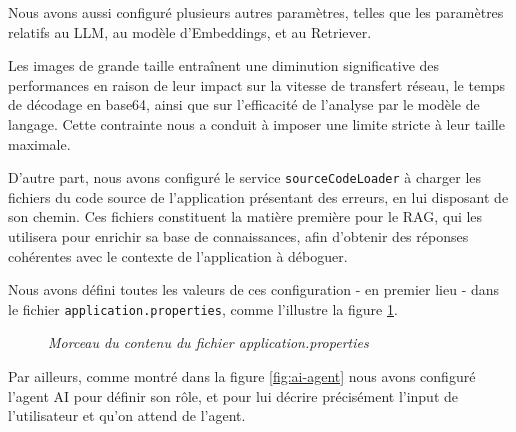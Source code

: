 \documentclass[12pt,a4paper]{report}
\begin{document}
	Nous avons aussi configuré plusieurs autres paramètres, telles que les paramètres relatifs au LLM, au modèle d'Embeddings, et au Retriever.
	
	Les images de grande taille entraînent une diminution significative des performances en raison de leur impact sur la vitesse de transfert réseau, le temps de décodage en base64, ainsi que sur l'efficacité de l'analyse par le modèle de langage. Cette contrainte nous a conduit à imposer une limite stricte à leur taille maximale.
	
	D'autre part, nous avons configuré le service \verb|sourceCodeLoader| à charger les fichiers du code source de l'application présentant des erreurs, en lui disposant de son chemin. Ces fichiers constituent la matière première pour le RAG, qui les utilisera pour enrichir sa base de connaissances, afin d'obtenir des réponses cohérentes avec le contexte de l'application à déboguer.
	
	Nous avons défini toutes les valeurs de ces configuration - en premier lieu - dans le fichier \verb|application.properties|, comme l'illustre la figure \ref{fig:properties}.
	
	\begin{figure}[H]
		\centering
		\caption{\textit{Morceau du contenu du fichier application.properties}}
		\label{fig:properties}
	\end{figure}
	
	Par ailleurs, comme montré dans la figure \ref{fig:ai-agent} nous avons configuré l'agent AI pour définir son rôle, et pour lui décrire précisément l'input de l'utilisateur et qu'on attend de l'agent.
	
\end{document}
